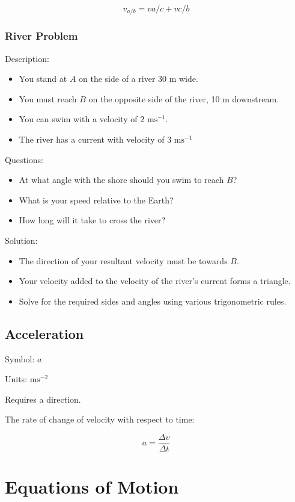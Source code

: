 \documentclass[a4paper,11pt]{report}
\begin{document}
$$
v_{a/b} = v{a/c} + v{c/b}
$$

\subsubsection{River Problem}

Description:

\begin{itemize}
\item You stand at $A$ on the side of a river 30 m wide.
\item You must reach $B$ on the opposite side of the river, 10 m downstream.
\item You can swim with a velocity of $2\mbox{ ms}^{-1}$.
\item The river has a current with velocity of $3\mbox{ ms}^{-1}$
\end{itemize}

Questions:

\begin{itemize}
\item At what angle with the shore should you swim to reach $B$?
\item What is your speed relative to the Earth?
\item How long will it take to cross the river?
\end{itemize}

Solution:

\begin{itemize}
\item The direction of your resultant velocity must be towards $B$.
\item Your velocity added to the velocity of the river's current forms a
	triangle.
\item Solve for the required sides and angles using various trigonometric rules.
\end{itemize}

\subsection{Acceleration}

Symbol: $a$

Units: $\mbox{ms}^{-2}$

Requires a direction.

The rate of change of velocity with respect to time:

$$
a = \frac{\Delta v}{\Delta t}
$$


\section{Equations of Motion}
\end{document}
